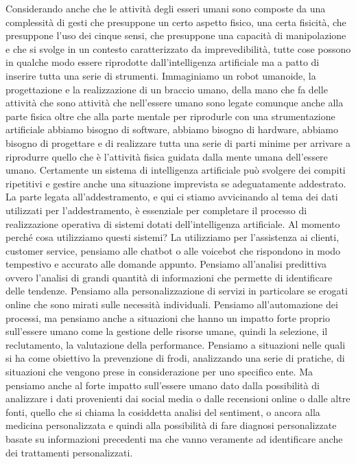 Considerando anche che le attività degli esseri umani sono composte da una complessità di gesti che presuppone un certo aspetto fisico, una certa fisicità, che presuppone l'uso dei cinque sensi, che presuppone una capacità di manipolazione e che si svolge in un contesto caratterizzato da imprevedibilità, tutte cose possono in qualche modo essere riprodotte dall'intelligenza artificiale ma a patto di inserire tutta una serie di strumenti.
Immaginiamo un robot umanoide, la progettazione e la realizzazione di un braccio umano, della mano che fa delle attività che sono attività che nell'essere umano sono legate comunque anche alla parte  fisica oltre che alla parte mentale per riprodurle con una strumentazione artificiale abbiamo bisogno di software, abbiamo bisogno di hardware, abbiamo bisogno di progettare e di realizzare tutta una serie di parti minime per arrivare a riprodurre quello che è l'attività fisica guidata dalla mente umana dell'essere umano.
Certamente un sistema di intelligenza artificiale può svolgere dei compiti ripetitivi e gestire anche una situazione imprevista se adeguatamente addestrato.
La parte legata all'addestramento, e qui ci stiamo avvicinando al tema dei dati utilizzati per l'addestramento, è essenziale per completare il processo di realizzazione operativa di sistemi dotati dell'intelligenza artificiale.
Al momento perché cosa utilizziamo questi sistemi?
La utilizziamo per l'assistenza ai clienti, customer service, pensiamo alle chatbot o alle voicebot che rispondono in modo tempestivo e accurato alle domande appunto.
Pensiamo all'analisi predittiva ovvero l'analisi di grandi quantità di informazioni che permette di identificare delle tendenze.
Pensiamo alla personalizzazione di servizi in particolare se erogati online che sono mirati sulle necessità individuali.
Pensiamo all'automazione dei processi, ma pensiamo anche a situazioni che hanno un impatto forte proprio sull'essere umano come la gestione delle risorse umane, quindi la selezione, il reclutamento, la valutazione della performance.
Pensiamo a situazioni nelle quali si ha come obiettivo la prevenzione di frodi, analizzando una serie di pratiche, di situazioni che vengono prese in considerazione per uno specifico ente.
Ma pensiamo anche al forte impatto sull'essere umano dato dalla possibilità di analizzare i dati provenienti dai social media o dalle recensioni online o dalle altre fonti, quello che si chiama la cosiddetta analisi del sentiment, o ancora alla medicina personalizzata e quindi alla possibilità di fare diagnosi personalizzate basate su informazioni precedenti ma che vanno veramente ad identificare anche dei trattamenti personalizzati.
